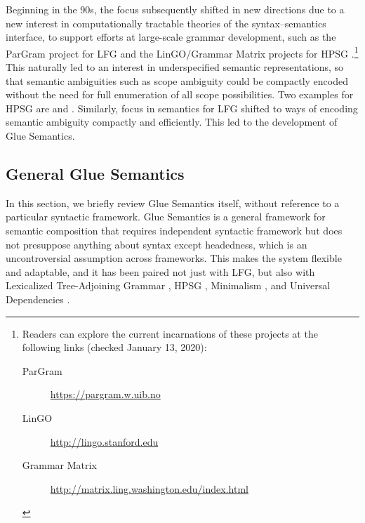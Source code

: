 Beginning in the 90s, the focus subsequently shifted in new directions due to a new interest in computationally tractable
theories of the syntax--semantics interface, to support efforts at
large-scale grammar development, such as the ParGram project for LFG
\citep{butt;ea99,butt;ea02-pargram} and the LinGO/Grammar Matrix projects for HPSG
\citep{flickinger00,bender;ea02,bender;ea10}.\footnote{Readers can
  explore the current incarnations of these projects at the following
links (checked January 13, 2020):
\begin{description}
\item[ParGram] \url{https://pargram.w.uib.no}
\item[LinGO] \url{http://lingo.stanford.edu}
\item[Grammar Matrix] \url{http://matrix.ling.washington.edu/index.html}
\end{description}
} This naturally led to an
interest in underspecified semantic representations, so that semantic
ambiguities such as scope ambiguity could be compactly encoded without
the need for full enumeration of all scope possibilities. Two examples
for HPSG are  \citep{richter04,penn;richter04}
and 
\citep{copestake;ea05}. Similarly, focus in semantics for LFG shifted
to ways of encoding semantic ambiguity compactly and efficiently. This
led to the development of Glue Semantics.



\subsection{General Glue Semantics}
\label{sec:glue-semantics}

In this section, we briefly review Glue Semantics itself, 
without reference to a particular
syntactic framework.  Glue Semantics is a general framework for
semantic composition that requires  independent syntactic
framework but does not presuppose anything about syntax except
headedness, which is an uncontroversial assumption across
frameworks. This makes the system flexible and adaptable, and it has
been paired not just with LFG, but also with Lexicalized
Tree-Adjoining Grammar \citep{frank;genabith01}, HPSG
\citep{asudeh;crouch01-hpsg-glue}, Minimalism \citep{Gotham2018}, and
Universal Dependencies \citep{gotham;haug18}.

